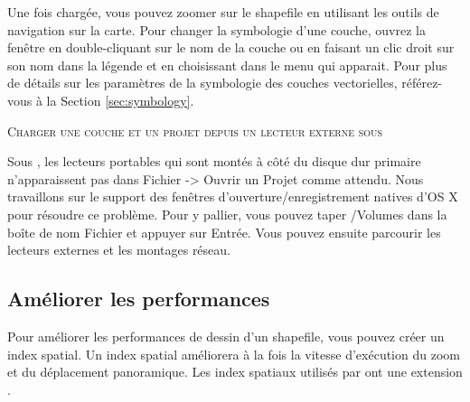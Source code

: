 Une fois chargée, vous pouvez zoomer sur le shapefile en utilisant les outils de navigation sur la carte.
Pour changer la symbologie d'une couche, ouvrez la fenêtre  en double-cliquant sur le nom de la couche ou en faisant un clic droit sur son nom dans la légende et en choisissant  dans le menu qui apparait. Pour plus de détails sur les paramètres de la symbologie des couches vectorielles, référez-vous à la Section \ref{sec:symbology}.

\begin{Tip}\caption{\textsc{Charger une couche et un projet depuis un lecteur externe sous \mac}}
Sous \mac, les lecteurs portables qui sont montés à côté du disque dur primaire n'apparaissent pas dans Fichier -> Ouvrir un Projet comme attendu. Nous travaillons sur le support des fenêtres d'ouverture/enregistrement natives d'OS X pour résoudre ce problème. Pour y pallier, vous pouvez taper /Volumes dans la boîte de nom Fichier et appuyer sur Entrée. Vous pouvez ensuite parcourir les lecteurs externes et les montages réseau.
\end{Tip}

\subsection{Améliorer les performances}

Pour améliorer les performances de dessin d'un shapefile, vous pouvez créer un index spatial. Un  index spatial améliorera à la fois la vitesse d'exécution du zoom et du déplacement panoramique. Les index spatiaux utilisés par \qg ont une extension .

